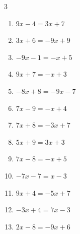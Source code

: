 \begin{multicols}{3}
\begin{enumerate}

  \item $9x-4=3x+7$


  \item $3x+6=-9x+9$


  \item $-9x-1=-x+5$


  \item $9x+7=-x+3$


  \item $-8x+8=-9x-7$

        \phantom{$\displaystyle x=-15$}

  \item $7x-9=-x+4$


\columnbreak %

\resetques

  \item $7x+8=-3x+7$


  \item $5x+9=3x+3$

        \phantom{$\displaystyle x=-3$}

  \item $7x-8=-x+5$


  \item $-7x-7=x-3$


  \item $9x+4=-5x+7$


  \item $-3x+4=7x-3$


  \item $2x-8=-9x+6$



\end{enumerate}
\end{multicols}
